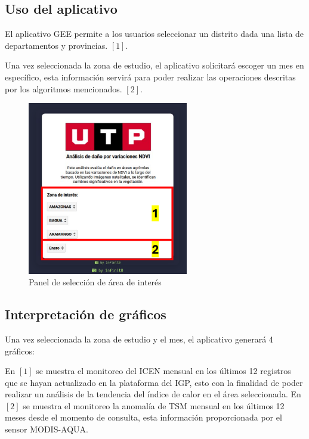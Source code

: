 \subsection{Uso del aplicativo}

El aplicativo GEE permite a los usuarios seleccionar un distrito dada una lista de departamentos y provincias. $[1]$.

Una vez seleccionada la zona de estudio, el aplicativo solicitará escoger un mes en específico, esta información servirá para poder realizar las operaciones descritas por los algoritmos mencionados. $[2]$.

\begin{figure}[ht]
  \centering
  \includegraphics[width=7cm, trim=37px 38px 38px 50px, clip]{assets/panel.png}
  \caption{Panel de selección de área de interés}
  \label{fig:panel}
\end{figure}

\subsection{Interpretación de gráficos}

Una vez seleccionada la zona de estudio y el mes, el aplicativo generará 4 gráficos:

En $[1]$ se muestra el monitoreo del ICEN mensual en los últimos 12 registros que se hayan actualizado en la plataforma del IGP, esto con la finalidad de poder realizar un análisis de la tendencia del índice de calor en el área seleccionada. En $[2]$ se muestra el monitoreo la anomalía de TSM mensual en los últimos 12 meses desde el momento de consulta, esta información proporcionada por el sensor MODIS-AQUA.

